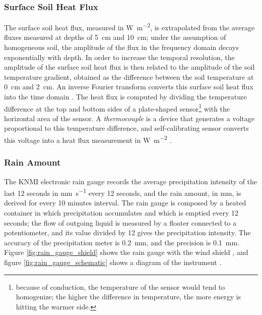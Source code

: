 \documentclass[a4paper]{book}
\begin{document}

\subsubsection{Surface Soil Heat Flux}
The surface soil heat flux, measured in \si{\watt\per\square\meter}, is extrapolated from the average fluxes measured at depths of \SI{5}{\centi\meter} and \SI{10}{\centi\meter}; under the assumption of homogeneous soil, the amplitude of the flux in the frequency domain decays exponentially with depth. In order to increase the temporal resolution, the amplitude of the surface soil heat flux is then related to the amplitude of the soil temperature gradient, obtained as the difference between the soil temperature at \SI{0}{\centi\meter} and \SI{2}{\centi\meter}. An inverse Fourier transform converts this surface soil heat flux into the time domain \citep[Appendix~A]{surface_soilheat}. The heat flux is computed by dividing the temperature difference at the top and bottom sides of a plate-shaped sensor\footnote{because of conduction, the temperature of the sensor would tend to homogenize; the higher the difference in temperature, the more energy is hitting the warmer side.} with the horizontal area of the sensor. A \emph{thermocouple} is a device that generates a voltage proportional to this temperature difference, and self-calibrating sensor converts this voltage into a heat flux measurement in \si{\watt\per\square\meter}  \citep{soilheat_sensor}.


\subsubsection{Rain Amount}
The KNMI electronic rain gauge \citep{rain,windsheld_rain} records the average precipitation intensity of the last 12 seconds in \si{\milli\meter\per\second} every 12 seconds, and the rain amount, in \si{\milli\meter}, is derived for every 10 minutes interval. The rain gauge is composed by a heated container in which precipitation accumulates and which is emptied every 12 seconds; the flow of outgoing liquid is measured by a floater connected to a potentiometer, and its value divided by 12 gives the precipitation intensity. The accuracy of the precipitation meter is \SI{0.2}{\milli\meter}, and the precision is \SI{0.1}{\milli\meter}. Figure \ref{fig:rain_gauge_shield} shows the rain gauge with the wind shield \citep{windsheld_rain}, and figure \ref{fig:rain_gauge_schematic} shows a diagram of the instrument \citep{rain}.
\end{document}
